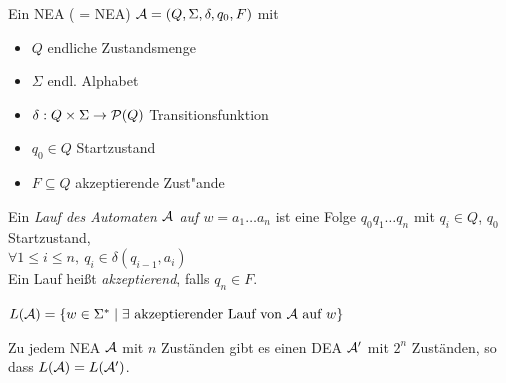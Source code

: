 \begin{Def}[name={[NEA]}]
	Ein \ac{NEA} ( = \acl{NEA}) $\mathcal{A} = (Q,\Sigma,\delta,q_0,F)$ mit
	\begin{itemize}
		\item $Q$ endliche Zustandsmenge
		\item $\Sigma$ endl. Alphabet
		\item $\delta:Q\x\Sigma\->\mathcal{P}(Q)$ Transitionsfunktion
		\item $q_0\in Q$ Startzustand
		\item $F\subseteq Q$ akzeptierende Zust"ande
	\end{itemize}
\end{Def}
\begin{Def}[name={[Lauf eines Automaten]}]
	Ein \emph{Lauf des Automaten $\mathcal{A}$ auf $w=a_1\dots a_n$} ist eine Folge $q_0q_1\dots q_n$ mit $q_i\in Q$, $q_0$ Startzustand,\\
	$\forall 1\leq i\leq n,\ q_i\in\delta(q_{i-1},a_i)$\\
	Ein Lauf heißt \emph{akzeptierend}, falls $q_n\in F$.
\end{Def}
\begin{Def}[name={[NEA zu DEA]}]
	$L(\mathcal{A})=\{ w\in\Sigma^* \mid \exists\text{ akzeptierender Lauf von $\mathcal{A}$ auf }w \}$
\end{Def}
\begin{Satz}[Rabin]
	Zu jedem \ac{NEA} $\mathcal{A}$ mit $n$ Zuständen gibt es einen \ac{DEA} $\mathcal{A}'$ mit $2^n$ Zuständen, so dass $L(\mathcal{A})=L(\mathcal{A}')$.
\end{Satz}
